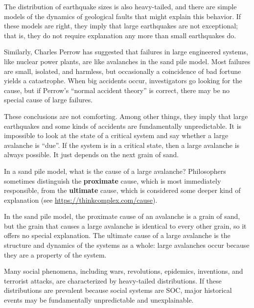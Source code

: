 \documentclass[12pt]{book}
\theoremstyle{exercise}
\begin{document}
The distribution of earthquake sizes is also heavy-tailed,
and there are simple models of the dynamics of geological faults
that might explain this behavior.  If these models are right,
they imply that large earthquakes are not exceptional; that is,
they do not require explanation any more than small earthquakes do.


Similarly, Charles Perrow has suggested that failures in large
engineered systems, like nuclear power plants, are like avalanches
in the sand pile model.  Most failures are small, isolated, and
harmless, but occasionally a coincidence of bad fortune yields a
catastrophe.  When big accidents occur, investigators go looking for
the cause, but if Perrow's ``normal accident theory'' is correct,
there may be no special cause of large failures.


These conclusions are not comforting.  Among other things, they
imply that large earthquakes and some kinds of accidents are
fundamentally unpredictable.  It is impossible to look at the
state of a critical system and say whether a large avalanche
is ``due''.  If the system is in a critical state, then a large
avalanche is always possible.  It just depends on the
next grain of sand.

In a sand pile model, what is the cause of a large avalanche?
Philosophers sometimes distinguish the {\bf proximate} cause, which is
most immediately responsible, from the {\bf ultimate} cause, which is considered some deeper kind of explanation (see \url{https://thinkcomplex.com/cause}).


In the sand pile model, the proximate cause of an avalanche is
a grain of sand, but the grain that causes a large avalanche
is identical to every other grain, so it offers no special explanation.
The ultimate cause of a large avalanche is the structure and
dynamics of the systems as a whole: large avalanches occur because
they are a property of the system.


Many social phenomena, including wars, revolutions, epidemics,
inventions, and terrorist attacks, are characterized by heavy-tailed
distributions.  If these distributions are prevalent because social systems are SOC, major historical events may be fundamentally unpredictable and unexplainable.
\end{document}
